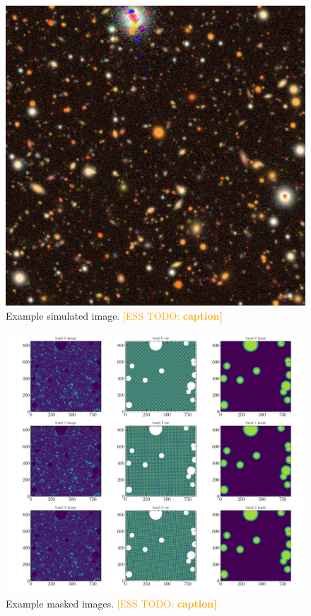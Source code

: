 \documentclass[twocolumn,twocolappendix,astrosym]{openjournal}
\newcommand{\esstodo}[1]{\textcolor{orange}{[ESS TODO: \bf #1]}}
\begin{document}
\begin{figure}
    \includegraphics[width=\columnwidth]{example-image.jpg}
    \caption{
        Example simulated image. \esstodo{caption}
    }
\end{figure}
\begin{figure}
    \includegraphics[width=\columnwidth]{example-masked-image.pdf}
    \caption{
        Example masked images. \esstodo{caption}
    }
\end{figure}
\end{document}

